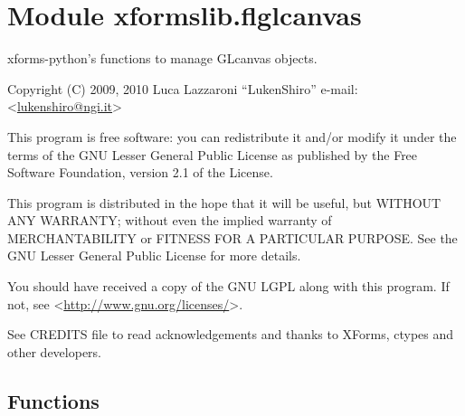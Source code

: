 %
%
%


\section{Module xformslib.flglcanvas}

    \label{xformslib:flglcanvas}

xforms-python's functions to manage GLcanvas objects.

Copyright (C) 2009, 2010  Luca Lazzaroni ``LukenShiro''
e-mail: <\href{mailto:lukenshiro@ngi.it}{lukenshiro@ngi.it}>

This program is free software: you can redistribute it and/or modify
it under the terms of the GNU Lesser General Public License as
published by the Free Software Foundation, version 2.1 of the License.

This program is distributed in the hope that it will be useful,
but WITHOUT ANY WARRANTY; without even the implied warranty of
MERCHANTABILITY or FITNESS FOR A PARTICULAR PURPOSE. See the
GNU Lesser General Public License for more details.

You should have received a copy of the GNU LGPL along with this
program. If not, see <\href{http://www.gnu.org/licenses/}{http://www.gnu.org/licenses/}>.

See CREDITS file to read acknowledgements and thanks to XForms,
ctypes and other developers.


  \subsection{Functions}

    \label{xformslib:flglcanvas:fl_add_glcanvas}

